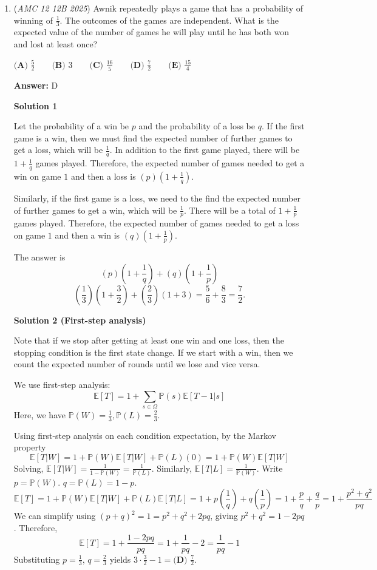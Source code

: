\begin{enumerate}
 


	\item (\textit{AMC 12 12B 2025}) Awnik repeatedly plays a game that has a probability of winning of $\frac{1}{3}$. The outcomes of the games are independent. What is the expected value of the number of games he will play until he has both won and lost at least once?


 $\textbf{(A) } \frac{5}{2} \qquad \textbf{(B) } 3 \qquad \textbf{(C) } \frac{16}{5} \qquad \textbf{(D) } \frac{7}{2} \qquad \textbf{(E) } \frac{15}{4}$

 \textbf{Answer: }D



\textbf{Solution 1}

Let the probability of a win be $p$ and the probability of a loss be $q$. If the first game is a win, then we must find the expected number of further games to get a loss, which will be $\frac{1}{q}$. In addition to the first game played, there will be $1+\frac{1}{q}$ games played. Therefore, the expected number of games needed to get a win on game $1$ and then a loss is $(p)\left(1+\frac{1}{q}\right).$

 Similarly, if the first game is a loss, we need to the find the expected number of further games to get a win, which will be $\frac{1}{p}$. There will be a total of $1+\frac{1}{p}$ games played. Therefore, the expected number of games needed to get a loss on game $1$ and then a win is $(q)\left(1+\frac{1}{p}\right).$

 The answer is
 \[(p)\left(1+\frac{1}{q}\right) + (q)\left(1+\frac{1}{p}\right)\]
 \[\left(\frac{1}{3}\right) \left(1+\frac{3}{2}\right) + \left(\frac{2}{3}\right)(1+3) = \frac{5}{6} + \frac{8}{3} = \boxed{\frac{7}{2}}.\]




\textbf{Solution 2 (First-step analysis)}

Note that if we stop after getting at least one win and one loss, then the stopping condition is the first state change. If we start with a win, then we count the expected number of rounds until we lose and vice versa.

 We use first-step analysis:
 \[\mathbb{E}[T]=1+\sum_{s\in \Omega}\mathbb{P}(s)\mathbb{E}[T-1|s]\]Here, we have $\mathbb{P}(W)=\frac{1}{3}, \mathbb{P}(L)=\frac{2}{3}$.

 Using first-step analysis on each condition expectation, by the Markov property
 \[\mathbb{E}[T|W]=1+\mathbb{P}(W)\mathbb{E}[T|W]+\mathbb{P}(L)(0)=1+\mathbb{P}(W)\mathbb{E}[T|W]\]Solving, $\mathbb{E}[T|W]=\frac{1}{1-\mathbb{P}(W)}=\frac{1}{\mathbb{P}(L)}$. Similarly, $\mathbb{E}[T|L]=\frac{1}{\mathbb{P}(W)}$. Write $p=\mathbb{P}(W)$. $q=\mathbb{P}(L)=1-p$.
 \[\mathbb{E}[T]=1+\mathbb{P}(W)\mathbb{E}[T|W]+\mathbb{P}(L)\mathbb{E}[T|L]=1+p\left( \frac{1}{q} \right)+q\left( \frac{1}{p} \right)=1+\frac{p}{q}+\frac{q}{p}=1+\frac{p^2+q^2}{pq}\]We can simplify using $(p+q)^2=1=p^2+q^2+2pq$, giving $p^2+q^2=1-2pq$. Therefore,
 \[\mathbb{E}[T]=1+\frac{1-2pq}{pq}=1+\frac{1}{pq}-2=\frac{1}{pq}-1\]Substituting $p=\frac{1}{3}$, $q=\frac{2}{3}$ yields $3\cdot \frac{3}{2}-1=\boxed{\textbf{(D) } \frac{7}{2}}$.


\end{enumerate}
